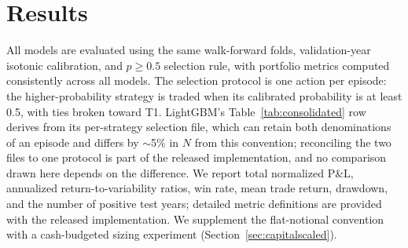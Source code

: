 \documentclass[sigconf,review]{acmart}
\begin{document}
\section{Results}
\label{sec:results}

All models are evaluated using the same walk-forward folds, validation-year isotonic calibration, and $p\ge0.5$ selection rule, with portfolio metrics computed consistently across all models. The selection protocol is one action per episode: the higher-probability strategy is traded when its calibrated probability is at least 0.5, with ties broken toward T1. LightGBM's Table~\ref{tab:consolidated} row derives from its per-strategy selection file, which can retain both denominations of an episode and differs by $\sim$5\% in $N$ from this convention; reconciling the two files to one protocol is part of the released implementation, and no comparison drawn here depends on the difference. We report total normalized P\&L, annualized return-to-variability ratios, win rate, mean trade return, drawdown, and the number of positive test years; detailed metric definitions are provided with the released implementation. We supplement the flat-notional convention with a cash-budgeted sizing experiment (Section~\ref{sec:capitalscaled}).
\end{document}
